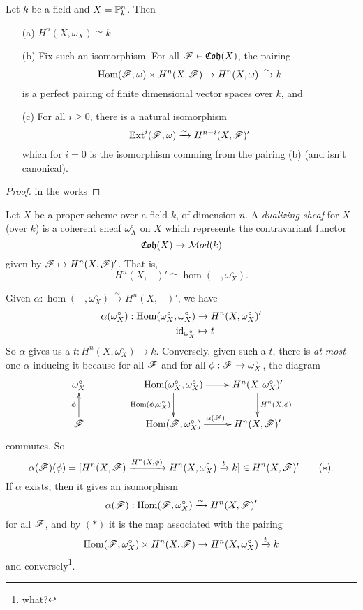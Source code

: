  \begin{theorem}[III.7.1]\label{T:III.7.1} Let $k$ be a field and $X=\P^n_k$.  Then
 \begin{itemize}
  \item[(a)] $H^n(X,\omega_X) \cong k$
  \item[(b)] Fix such an isomorphism.  For all $\F\in
  \mathfrak{Coh}(X)$, the pairing
  \[
    \hom(\F,\omega)\times H^n(X,\F) \to H^n(X,\omega)
    \xrightarrow{\sim} k
  \]
  is a perfect pairing of finite dimensional vector spaces over
  $k$, and
  \item[(c)] For all $i\ge 0$, there is a natural isomorphism
  \[
    \ext^i(\F,\omega) \xrightarrow{\sim} H^{n-i}(X,\F)'
  \]
  which for $i=0$ is the isomorphism comming from the pairing (b)
  (and isn't canonical).
 \end{itemize}
 \end{theorem}

 \begin{proof}
 in the works
 \end{proof}

 \begin{definition} 
 Let $X$ be a proper scheme over a field $k$, of
 dimension $n$.  A \emph{dualizing sheaf} for $X$ (over $k$) is a
 coherent sheaf $\omega_X^{\circ}$ on $X$ which represents the
 contravariant functor
 \[
    \mathfrak{Coh}(X)\to \Mod(k)
 \]
 given by $\F\mapsto H^n(X,\F)'$.  That is,
 \[
    H^n(X,-)'\cong \hom (-,\omega_X^{\circ}).
 \]
 \end{definition}

 Given $\alpha: \hom(-,\omega_X^{\circ})\xrightarrow{\sim}
 H^n(X,-)'$, we have
 \begin{align*}
  \alpha(\omega_X^{\circ}):
  \hom(\omega_X^{\circ},\omega_X^{\circ})&\to
  H^n(X,\omega_X^{\circ})'\\
  \id_{\omega_X^{\circ}} &\mapsto t
 \end{align*}
 So $\alpha$ gives us a $t:H^n(X,\omega_X^{\circ})\to k$.
 Conversely, given such a $t$, there is \emph{at most} one
 $\alpha$ inducing it because for all $\F$ and for all $\phi:\F\to
 \omega_X^{\circ}$, the diagram
 \[\xymatrix{
 \omega_X^{\circ}& & \hom(\omega_X^{\circ},\omega_X^{\circ})\ar[r]\ar[d]_{\hom(\phi,\omega_X^{\circ})}
 & H^n(X,\omega_X^{\circ})' \ar[d]^{H^n(X,\phi)} \\
 \F\ar[u]^{\phi}& & \hom(\F,\omega_X^{\circ}) \ar[r]^{\alpha(\F)} & H^n(X,\F)'
 }\]
 commutes.  So
 \[
 \alpha(\F)(\phi) =
 [H^n(X,\F)\xrightarrow{H^n(X,\phi)}H^n(X,\omega_X^{\circ})
 \xrightarrow{t} k]\in H^n(X,\F)' \tag{$\ast$}.
 \]
 If $\alpha$ exists, then it gives an isomorphism
 \[
 \alpha(\F):\hom(\F,\omega_X^{\circ})\xrightarrow{\sim} H^n(X,\F)'
 \]
 for all $\F$, and by $(\ast)$ it is the map associated with the
 pairing
 \[
    \hom(\F,\omega_X^{\circ})\times H^n(X,\F) \to
    H^n(X,\omega_X^{\circ})\xrightarrow{t} k
 \]
 and conversely\footnote{what?}.

